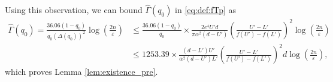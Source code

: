 \documentclass[onecolumn,letterpaper]{IEEEtran}
\newcommand{\cp}{{q}}
\newcommand{\up}{{U}}
\newcommand{\lw}{{L}}
\newcommand{\ap}{{\alpha}}
\newcommand{\ftaup}{{\hat{\Gamma}}}
\newcommand{\cpns}{\cp_0}
\newcommand{\fTpns}{\ftaup (\cpns)}
\newcommand{\pgapns}{{\Delta(\cpns)}}
\begin{document}
Using this observation, we can bound $\fTpns$ in \eqref{eq:def:fTp} as
\begin{align*}
\fTpns = \frac{36.06(1-\cpns )}{\cpns  (\pgapns)^2} \log \left( \frac{2n}{\varepsilon} \right) 
&\leq  \frac{36.06(1-\cpns )}{\cpns}\times\frac{2e^4 \up' d}{\pi \ap^2 (d-\up')} \left(\frac{\up'-\lw'}{f(\up')-f(\lw')} \right)^2 \log \left( \frac{2n}{\varepsilon} \right)\\
&\leq 1253.39 \times \frac{ (d-\lw') \up' }{\ap^2 (d-\up')\lw'} \left( \frac{\up'-\lw'}{f(\up')-f(\lw')} \right)^2  d\log \left( \frac{2n}{\varepsilon } \right),
\end{align*}
which proves Lemma \ref{lem:existence_pre}.


















%
\end{document}
